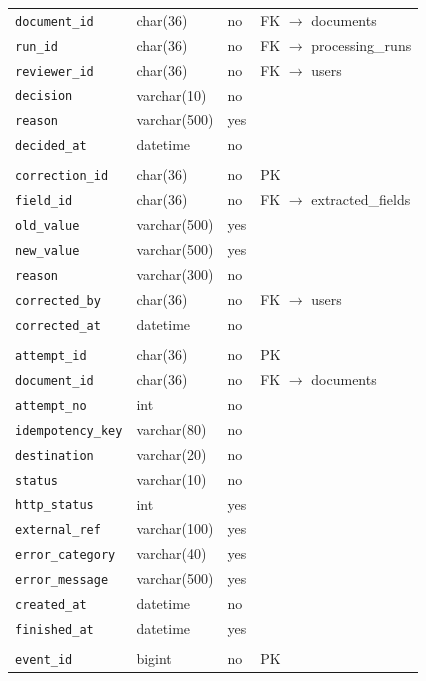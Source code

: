 \documentclass[11pt,a4paper]{report}
\begin{document}
{\begin{longtable}{L{4.2cm}L{3.4cm}L{1.1cm}L{5.0cm}}
\texttt{document\_id} & char(36) & no & FK $\rightarrow$ documents\\
\texttt{run\_id} & char(36) & no & FK $\rightarrow$ processing\_runs\\
\texttt{reviewer\_id} & char(36) & no & FK $\rightarrow$ users\\
\texttt{decision} & varchar(10) & no & \\
\texttt{reason} & varchar(500) & yes & \\
\texttt{decided\_at} & datetime & no & \\
\\
\texttt{correction\_id} & char(36) & no & PK\\
\texttt{field\_id} & char(36) & no & FK $\rightarrow$ extracted\_fields\\
\texttt{old\_value} & varchar(500) & yes & \\
\texttt{new\_value} & varchar(500) & yes & \\
\texttt{reason} & varchar(300) & no & \\
\texttt{corrected\_by} & char(36) & no & FK $\rightarrow$ users\\
\texttt{corrected\_at} & datetime & no & \\
\\
\texttt{attempt\_id} & char(36) & no & PK\\
\texttt{document\_id} & char(36) & no & FK $\rightarrow$ documents\\
\texttt{attempt\_no} & int & no & \\
\texttt{idempotency\_key} & varchar(80) & no & \\
\texttt{destination} & varchar(20) & no & \\
\texttt{status} & varchar(10) & no & \\
\texttt{http\_status} & int & yes & \\
\texttt{external\_ref} & varchar(100) & yes & \\
\texttt{error\_category} & varchar(40) & yes & \\
\texttt{error\_message} & varchar(500) & yes & \\
\texttt{created\_at} & datetime & no & \\
\texttt{finished\_at} & datetime & yes & \\
\\
\texttt{event\_id} & bigint & no & PK\\

\end{longtable}}
\end{document}
